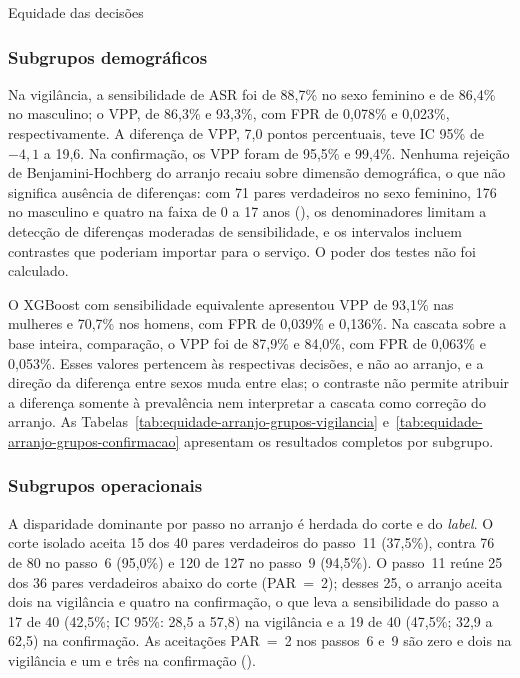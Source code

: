 \begin{chapter}{Equidade das decisões}
\subsubsection{Subgrupos demográficos}

Na vigilância, a sensibilidade de ASR foi de 88,7\% no sexo feminino e de 86,4\% no masculino; o VPP, de 86,3\% e 93,3\%, com FPR de 0,078\% e 0,023\%, respectivamente. A diferença de VPP, 7,0 pontos percentuais, teve IC 95\% de $-4{,}1$ a 19,6. Na confirmação, os VPP foram de 95,5\% e 99,4\%. Nenhuma rejeição de Benjamini-Hochberg do arranjo recaiu sobre dimensão demográfica, o que não significa ausência de diferenças: com 71 pares verdadeiros no sexo feminino, 176 no masculino e quatro na faixa de 0 a 17 anos (), os denominadores limitam a detecção de diferenças moderadas de sensibilidade, e os intervalos incluem contrastes que poderiam importar para o serviço. O poder dos testes não foi calculado.

O XGBoost com sensibilidade equivalente apresentou VPP de 93,1\% nas mulheres e 70,7\% nos homens, com FPR de 0,039\% e 0,136\%. Na cascata sobre a base inteira, comparação, o VPP foi de 87,9\% e 84,0\%, com FPR de 0,063\% e 0,053\%. Esses valores pertencem às respectivas decisões, e não ao arranjo, e a direção da diferença entre sexos muda entre elas; o contraste não permite atribuir a diferença somente à prevalência nem interpretar a cascata como correção do arranjo. As Tabelas~\ref{tab:equidade-arranjo-grupos-vigilancia} e~\ref{tab:equidade-arranjo-grupos-confirmacao} apresentam os resultados completos por subgrupo.





\subsubsection{Subgrupos operacionais}

A disparidade dominante por passo no arranjo é herdada do corte e do \textit{label}. O corte isolado aceita 15 dos 40 pares verdadeiros do passo~11 (37,5\%), contra 76 de 80 no passo~6 (95,0\%) e 120 de 127 no passo~9 (94,5\%). O passo~11 reúne 25 dos 36 pares verdadeiros abaixo do corte (PAR~=~2); desses 25, o arranjo aceita dois na vigilância e quatro na confirmação, o que leva a sensibilidade do passo a 17 de 40 (42,5\%; IC 95\%: 28,5 a 57,8) na vigilância e a 19 de 40 (47,5\%; 32,9 a 62,5) na confirmação. As aceitações PAR~=~2 nos passos~6 e~9 são zero e dois na vigilância e um e três na confirmação ().


\end{chapter}
